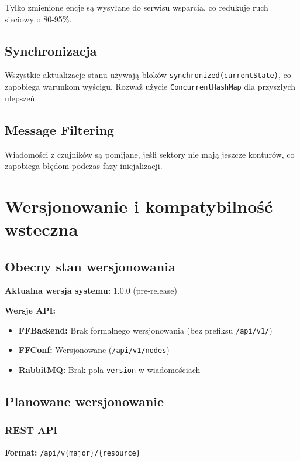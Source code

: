 Tylko zmienione encje są wysyłane do serwisu wsparcia, co redukuje ruch sieciowy o 80-95\%.

\subsection{Synchronizacja}

Wszystkie aktualizacje stanu używają bloków \texttt{synchronized(currentState)}, co zapobiega warunkom wyścigu. Rozważ użycie \texttt{ConcurrentHashMap} dla przyszłych ulepszeń.

\subsection{Message Filtering}

Wiadomości z czujników są pomijane, jeśli sektory nie mają jeszcze konturów, co zapobiega błędom podczas fazy inicjalizacji.

\section{Wersjonowanie i kompatybilność wsteczna}

\subsection{Obecny stan wersjonowania}

\textbf{Aktualna wersja systemu:} 1.0.0 (pre-release)

\textbf{Wersje API:}
\begin{itemize}
    \item \textbf{FFBackend:} Brak formalnego wersjonowania (bez prefiksu \texttt{/api/v1/})
    \item \textbf{FFConf:} Wersjonowane (\texttt{/api/v1/nodes})
    \item \textbf{RabbitMQ:} Brak pola \texttt{version} w wiadomościach
\end{itemize}

\subsection{Planowane wersjonowanie}

\subsubsection{REST API}

\textbf{Format:} \texttt{/api/v\{major\}/\{resource\}}

